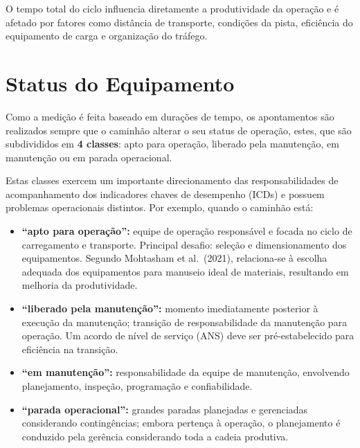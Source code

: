 \documentclass[
  letterpaper,
]{book}
\begin{document}
\begin{tcolorbox}[enhanced jigsaw, titlerule=0mm, coltitle=black, rightrule=.15mm, colback=white, breakable, title=\textcolor{quarto-callout-note-color}{\faInfo}\hspace{0.5em}{Note}, opacityback=0, bottomtitle=1mm, opacitybacktitle=0.6, arc=.35mm, colbacktitle=quarto-callout-note-color!10!white, toptitle=1mm, bottomrule=.15mm, left=2mm, toprule=.15mm, leftrule=.75mm, colframe=quarto-callout-note-color-frame]

O tempo total do ciclo influencia diretamente a produtividade da
operação e é afetado por fatores como distância de transporte, condições
da pista, eficiência do equipamento de carga e organização do tráfego.

\end{tcolorbox}

\section{Status do Equipamento}\label{sec-status-equipamento}

Como a medição é feita baseado em durações de tempo, os apontamentos são
realizados sempre que o caminhão alterar o seu status de operação,
estes, que são subdivididos em \textbf{4 classes}: apto para operação,
liberado pela manutenção, em manutenção ou em parada operacional.

Estas classes exercem um importante direcionamento das responsabilidades
de acompanhamento dos indicadores chaves de desempenho (ICDs) e possuem
problemas operacionais distintos. Por exemplo, quando o caminhão está:

\begin{itemize}
\item
  \textbf{``apto para operação'':} equipe de operação responsável e
  focada no ciclo de carregamento e transporte. Principal desafio:
  seleção e dimensionamento dos equipamentos. Segundo Mohtasham et
  al.~(2021), relaciona-se à escolha adequada dos equipamentos para
  manuseio ideal de materiais, resultando em melhoria da produtividade.
\item
  \textbf{``liberado pela manutenção'':} momento imediatamente posterior
  à execução da manutenção; transição de responsabilidade da manutenção
  para operação. Um acordo de nível de serviço (ANS) deve ser
  pré-estabelecido para eficiência na transição.
\item
  \textbf{``em manutenção'':} responsabilidade da equipe de manutenção,
  envolvendo planejamento, inspeção, programação e confiabilidade.
\item
  \textbf{``parada operacional'':} grandes paradas planejadas e
  gerenciadas considerando contingências; embora pertença à operação, o
  planejamento é conduzido pela gerência considerando toda a cadeia
  produtiva.
\end{itemize}
\end{document}

